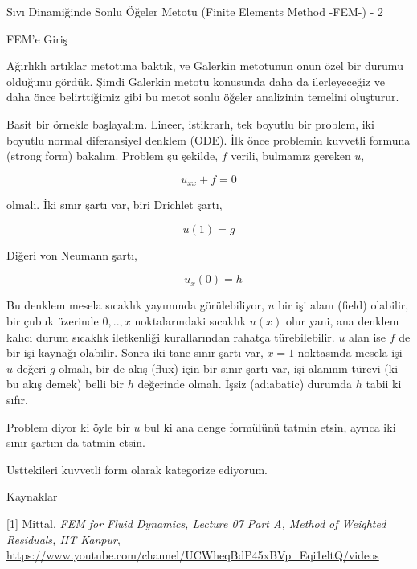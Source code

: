 \documentclass[12pt,fleqn]{article}\usepackage{../../common}
\begin{document}
Sıvı Dinamiğinde Sonlu Öğeler Metotu (Finite Elements Method -FEM-) - 2

FEM'e Giriş

Ağırlıklı artıklar metotuna baktık, ve Galerkin metotunun onun özel bir durumu
olduğunu gördük. Şimdi Galerkin metotu konusunda daha da ilerleyeceğiz ve daha
önce belirttiğimiz gibi bu metot sonlu öğeler analizinin temelini oluşturur.

Basit bir örnekle başlayalım. Lineer, istikrarlı, tek boyutlu bir problem, iki
boyutlu normal diferansiyel denklem (ODE). İlk önce problemin kuvvetli formuna
(strong form) bakalım. Problem şu şekilde, $f$ verili, bulmamız gereken $u$,

$$
u_{xx} + f = 0
$$

olmalı. İki sınır şartı var, biri Drichlet şartı,

$$
u(1) = g
$$

Diğeri von Neumann şartı,

$$
-u_{x}(0) = h
$$

Bu denklem mesela sıcaklık yayımında görülebiliyor, $u$ bir işi alanı (field)
olabilir, bir çubuk üzerinde $0,..,x$ noktalarındaki sıcaklık $u(x)$ olur
yani, ana denklem kalıcı durum sıcaklık iletkenliği kurallarından rahatça
türebilebilir. $u$ alan ise $f$ de bir işi kaynağı olabilir. Sonra iki tane
sınır şartı var, $x=1$ noktasında mesela işi $u$ değeri $g$ olmalı, bir de
akış (flux) için bir sınır şartı var, işi alanının türevi (ki bu akış demek)
belli bir $h$ değerinde olmalı. İşsiz (adıabatic) durumda $h$ tabii ki sıfır. 

Problem diyor ki öyle bir $u$ bul ki ana denge formülünü tatmin etsin,
ayrıca iki sınır şartını da tatmin etsin.

Usttekileri kuvvetli form olarak kategorize ediyorum. 


Kaynaklar

[1] Mittal, {\em FEM for Fluid Dynamics, Lecture 07 Part A, Method of Weighted Residuals, IIT Kanpur},
    \url{https://www.youtube.com/channel/UCWheqBdP45xBVp_Eqi1eltQ/videos}
\end{document}
